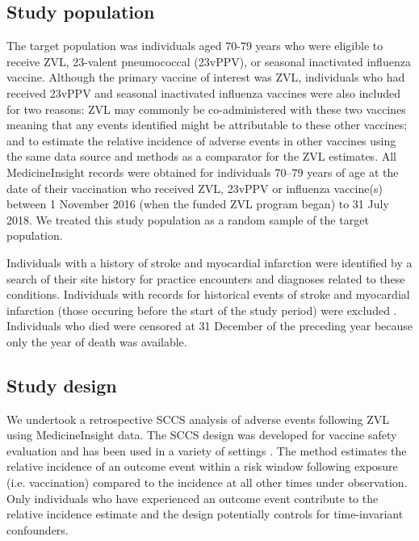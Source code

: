 \documentclass[review, endfloat]{elsarticle}
\begin{document}

\subsection{Study population}

The target population was individuals aged 70-79 years who were eligible to receive ZVL, 23-valent pneumococcal (23vPPV), or seasonal inactivated influenza vaccine. Although the primary vaccine of interest was ZVL, individuals who had received 23vPPV and seasonal inactivated influenza vaccines were also included for two reasons: ZVL may commonly be co-administered with these two vaccines meaning that any events identified might be attributable to these other vaccines; and to estimate the relative incidence of adverse events in other vaccines using the same data source and methods as a comparator for the ZVL estimates.  All MedicineInsight records were obtained for individuals 70–79 years of age at the date of their vaccination who received ZVL, 23vPPV or influenza vaccine(s) between 1 November 2016 (when the funded ZVL program began) to 31 July 2018. We treated this study population as a random sample of the target population. 

Individuals with a history of stroke and myocardial infarction were identified by a search of their site history for practice encounters and diagnoses related to these conditions. Individuals with records for historical events of stroke and myocardial infarction (those occuring before the start of the study period) were excluded . Individuals who died were censored at 31 December of the preceding year because only the year of death was available. 

\subsection{Study design}

We undertook a retrospective SCCS analysis of adverse events following ZVL using MedicineInsight data. The SCCS design was developed for vaccine safety evaluation \citep{farrington1995} and has been used in a variety of settings \citep{buttery2011intussusception, bakken2015febrile, stowe2016risk}. The method estimates the relative incidence of an outcome event within a risk window following exposure (i.e. vaccination) compared to the incidence at all other times under observation. Only individuals who have experienced an outcome event contribute to the relative incidence estimate and the design potentially controls for time-invariant confounders.
\end{document}
